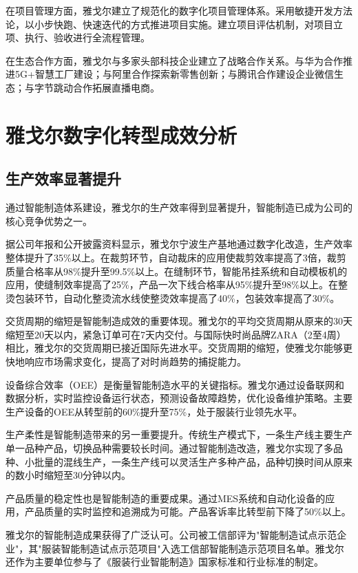 \documentclass[12pt,a4paper]{article}
\begin{document}
在项目管理方面，雅戈尔建立了规范化的数字化项目管理体系。采用敏捷开发方法论，以小步快跑、快速迭代的方式推进项目实施。建立项目评估机制，对项目立项、执行、验收进行全流程管理。

在生态合作方面，雅戈尔与多家头部科技企业建立了战略合作关系。与华为合作推进5G+智慧工厂建设；与阿里合作探索新零售创新；与腾讯合作建设企业微信生态；与字节跳动合作拓展直播电商。

\newpage

\section{雅戈尔数字化转型成效分析}

\subsection{生产效率显著提升}

通过智能制造体系建设，雅戈尔的生产效率得到显著提升，智能制造已成为公司的核心竞争优势之一。

据公司年报和公开披露资料显示，雅戈尔宁波生产基地通过数字化改造，生产效率整体提升了35\%以上。在裁剪环节，自动裁床的应用使裁剪效率提高了3倍，裁剪质量合格率从98\%提升至99.5\%以上。在缝制环节，智能吊挂系统和自动模板机的应用，使缝制效率提高了25\%，产品一次下线合格率从95\%提升至98\%以上。在整烫包装环节，自动化整烫流水线使整烫效率提高了40\%，包装效率提高了30\%。

交货周期的缩短是智能制造成效的重要体现。雅戈尔的平均交货周期从原来的30天缩短至20天以内，紧急订单可在7天内交付。与国际快时尚品牌ZARA（2至4周）相比，雅戈尔的交货周期已接近国际先进水平。交货周期的缩短，使雅戈尔能够更快地响应市场需求变化，提高了对时尚趋势的捕捉能力。

设备综合效率（OEE）是衡量智能制造水平的关键指标。雅戈尔通过设备联网和数据分析，实时监控设备运行状态，预测设备故障趋势，优化设备维护策略。主要生产设备的OEE从转型前的60\%提升至75\%，处于服装行业领先水平。

生产柔性是智能制造带来的另一重要提升。传统生产模式下，一条生产线主要生产单一品种产品，切换品种需要较长时间。通过智能制造改造，雅戈尔实现了多品种、小批量的混线生产，一条生产线可以灵活生产多种产品，品种切换时间从原来的数小时缩短至30分钟以内。

产品质量的稳定性也是智能制造的重要成果。通过MES系统和自动化设备的应用，产品质量的实时监控和追溯成为可能。产品客诉率比转型前下降了50\%以上。

雅戈尔的智能制造成果获得了广泛认可。公司被工信部评为"智能制造试点示范企业"，其"服装智能制造试点示范项目"入选工信部智能制造示范项目名单。雅戈尔还作为主要单位参与了《服装行业智能制造》国家标准和行业标准的制定。
\end{document}
